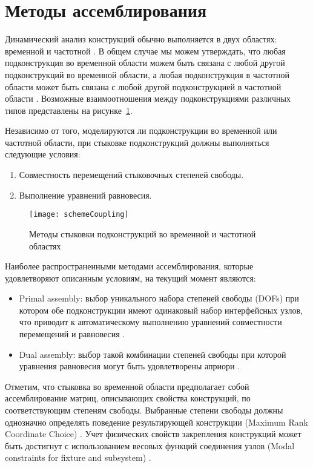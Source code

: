 \section{Методы ассемблирования}

Динамический анализ конструкций обычно выполняется в двух областях: временной \cite{lib:coupling:Dong&Shuo, lib:coupling:Gram-Schmidt} и частотной \cite{lib:coupling:Peeters}. В общем случае мы можем утверждать, что любая подконструкция во временной области можем быть связана с любой другой подконструкций во временной области, а любая подконструкция в частотной области может быть связана с любой другой подконструкцией в частотной области \cite{lib:coupling:Valk}. Возможные взаимоотношения между подконструкциями различных типов представлены на рисунке~\ref{fig:schemeCoupling}.

Независимо от того, моделируются ли подконструкции во временной или частотной области, при стыковке подконструкций должны выполняться следующие условия:
\begin{enumerate}[noitemsep]
	\item Совместность перемещений стыковочных степеней свободы.
	\item Выполнение уравнений равновесия. 
\end{enumerate}

\begin{figure}[!htb]
	\centering
	\texttt{[image: schemeCoupling]}
	\caption{Методы стыковки подконструкций во временной и частотной областях} \label{fig:schemeCoupling}
\end{figure}

Наиболее распространенными методами ассемблирования, которые удовлетворяют описанным условиям, на текущий момент являются:
\begin{itemize}
	\item Primal assembly: выбор уникального набора степеней свободы (DOFs) при котором обе подконструкции имеют одинаковый набор интерфейсных узлов, что приводит к автоматическому выполнению уравнений совместности перемещений и равновесия \cite{lib:coupling:Fregolent}.
	\item Dual assembly: выбор такой комбинации степеней свободы при которой уравнения равновесия  могут быть удовлетворены априори \cite{lib:coupling:DAmbrogio}.
\end{itemize}

Отметим, что стыковка во временной области предполагает собой ассемблирование матриц, описывающих свойства конструкций, по соответствующим степеням свободы. Выбранные степени свободы должны однозначно определять поведение результирующей конструкции (Maximum Rank Coordinate Choice) \cite{lib:coupling:Allen&Mayes}. Учет физических свойств закрепления конструкций может быть достигнут с использованием весовых функций соединения узлов (Modal constraints for fixture and subsystem) \cite{lib:coupling:Allen}. 

